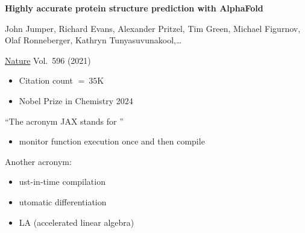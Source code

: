 \begin{frame}
    
    \textbf{Highly accurate protein structure prediction with AlphaFold}

        \vspace{0.5em}
    John Jumper, Richard Evans, Alexander Pritzel, Tim Green, Michael Figurnov,
    Olaf Ronneberger, Kathryn Tunyasuvunakool,\ldots 

        \vspace{0.5em}
    \underline{Nature} Vol.\ 596 (2021)

    \vspace{0.5em}
    \vspace{0.5em}
    \vspace{0.5em}
    \vspace{0.5em}
    \begin{itemize}
        \item Citation count $= ~35$K
        \vspace{0.5em}
        \item Nobel Prize in Chemistry 2024
    \end{itemize}

\end{frame}


\begin{frame}

    ``The acronym JAX stands for ''

    \begin{itemize}
        \item monitor function execution once and then compile
    \end{itemize} 

            \vspace{0.5em}
            \vspace{0.5em}
            \vspace{0.5em}

    Another acronym:

    \begin{itemize}
        \item {}ust-in-time compilation
            \vspace{0.5em}
        \item {}utomatic differentiation
            \vspace{0.5em}
        \item {}LA (accelerated linear algebra)
    \end{itemize}



\end{frame}

